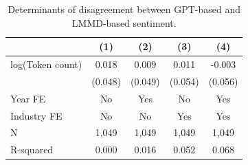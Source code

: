 \begin{table}
\caption{Determinants of disagreement between GPT-based and LMMD-based sentiment.}
\label{tab:disagreement_determinants}
\begin{tabular}{lcccc}
\toprule
 & (1) & (2) & (3) & (4) \\
\midrule
log(Token count) & 0.018 & 0.009 & 0.011 & -0.003 \\
 & (0.048) & (0.049) & (0.054) & (0.056) \\
Year FE & No & Yes & No & Yes \\
Industry FE & No & No & Yes & Yes \\
N & 1,049 & 1,049 & 1,049 & 1,049 \\
R-squared & 0.000 & 0.016 & 0.052 & 0.068 \\
\bottomrule
\end{tabular}
\end{table}
